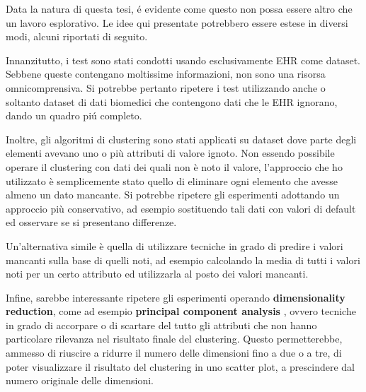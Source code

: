 \documentclass[a4paper, 12pt]{report}
\begin{document}
		Data la natura di questa tesi, é evidente come questo non possa
		essere altro che un lavoro esplorativo. Le idee qui presentate
		potrebbero essere estese in diversi modi, alcuni riportati di
		seguito.

		Innanzitutto, i test sono stati condotti usando esclusivamente EHR
		come dataset. Sebbene queste contengano moltissime informazioni, non
		sono una risorsa omnicomprensiva. Si potrebbe pertanto ripetere i
		test utilizzando anche o soltanto dataset di dati biomedici che
		contengono dati che le EHR ignorano, dando un quadro piú completo.

		Inoltre, gli algoritmi di clustering sono stati applicati su dataset
		dove parte degli elementi avevano uno o più attributi di valore
		ignoto. Non essendo possibile operare il clustering con dati dei
		quali non è noto il valore, l'approccio che ho utilizzato è
		semplicemente stato quello di eliminare ogni elemento che avesse
		almeno un dato mancante. Si potrebbe ripetere gli esperimenti
		adottando un approccio più conservativo, ad esempio sostituendo
		tali dati con valori di default ed osservare se si presentano
		differenze.

		Un'alternativa simile è quella di utilizzare tecniche in grado di
		predire i valori mancanti sulla base di quelli noti, ad esempio
		calcolando la media di tutti i valori noti per un certo attributo
		ed utilizzarla al posto dei valori mancanti.

		Infine, sarebbe interessante ripetere gli esperimenti operando
		\textbf{dimensionality reduction}, come ad esempio \textbf{principal
		component analysis} \cite{Hotelling1933AnalysisOA}, ovvero tecniche
		in grado di accorpare o di scartare del tutto gli attributi che non
		hanno particolare rilevanza nel risultato finale del clustering.
		Questo permetterebbe, ammesso di riuscire a ridurre il numero delle
		dimensioni fino a due o a tre, di poter visualizzare il risultato
		del clustering in uno scatter plot, a prescindere dal numero originale
		delle dimensioni.

	\printbibliography
\end{document}
